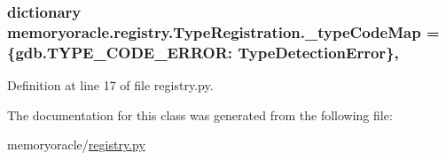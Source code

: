 \subsubsection[{\+\_\+type\+Code\+Map}]{\setlength{\rightskip}{0pt plus 5cm}dictionary memoryoracle.\+registry.\+Type\+Registration.\+\_\+type\+Code\+Map = \{gdb.\+T\+Y\+P\+E\+\_\+\+C\+O\+D\+E\+\_\+\+E\+R\+R\+O\+R\+: {\bf Type\+Detection\+Error}\}\hspace{0.3cm}{\ttfamily [static]}, {\ttfamily [private]}}\label{classmemoryoracle_1_1registry_1_1TypeRegistration_a0f8bbbddaa054388c8c84efef397d967}


Definition at line 17 of file registry.\+py.



The documentation for this class was generated from the following file\+:\begin{DoxyCompactItemize}
\item 
memoryoracle/\hyperlink{registry_8py}{registry.\+py}\end{DoxyCompactItemize}
